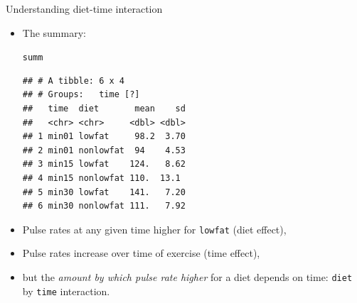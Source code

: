 \documentclass[unknownkeysallowed]{beamer}\usepackage[]{graphicx}\usepackage[]{color}
\makeatletter
\newcommand{\hlstd}[1]{\textcolor[rgb]{0.345,0.345,0.345}{#1}}%
\newenvironment{kframe}{%
 \def\at@end@of@kframe{}%
 \ifinner\ifhmode%
  \def\at@end@of@kframe{\end{minipage}}%
  \begin{minipage}{\columnwidth}%
 \fi\fi%
 \def\FrameCommand##1{\hskip\@totalleftmargin \hskip-\fboxsep
 \colorbox{shadecolor}{##1}\hskip-\fboxsep
     \hskip-\linewidth \hskip-\@totalleftmargin \hskip\columnwidth}%
 \MakeFramed {\advance\hsize-\width
   \@totalleftmargin\z@ \linewidth\hsize
   \@setminipage}}%
 {\par\unskip\endMakeFramed%
 \at@end@of@kframe}
\newenvironment{knitrout}{}{} %
\makeatother
\begin{document}
\begin{frame}[fragile]{Understanding diet-time interaction}

  \begin{itemize}
    \item The summary:
\begin{knitrout}\small
{}\color{fgcolor}\begin{kframe}
\begin{alltt}
\hlstd{summ}
\end{alltt}
\begin{verbatim}
## # A tibble: 6 x 4
## # Groups:   time [?]
##   time  diet       mean    sd
##   <chr> <chr>     <dbl> <dbl>
## 1 min01 lowfat     98.2  3.70
## 2 min01 nonlowfat  94    4.53
## 3 min15 lowfat    124.   8.62
## 4 min15 nonlowfat 110.  13.1 
## 5 min30 lowfat    141.   7.20
## 6 min30 nonlowfat 111.   7.92
\end{verbatim}
\end{kframe}
\end{knitrout}
  \item Pulse rates at any given time higher for \texttt{lowfat} (diet
  effect), 
  \item Pulse rates increase over time of exercise (time effect),
    
  \item but the \emph{amount by which pulse rate higher} for a diet depends on
  time: \texttt{diet} by \texttt{time} interaction.

  \end{itemize}
  
\end{frame}
\end{document}
